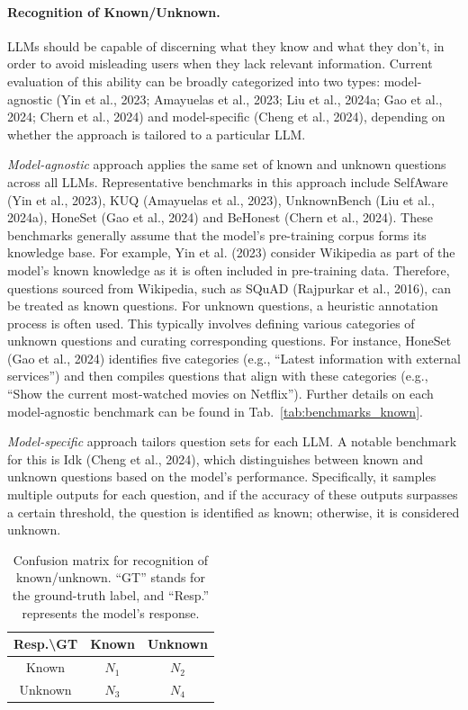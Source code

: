 \paragraph{Recognition of Known/Unknown.} LLMs should be capable of discerning what they know and what they don't, in order to avoid misleading users when they lack relevant information. Current evaluation of this ability can be broadly categorized into two types: model-agnostic (Yin et al., 2023; Amayuelas et al., 2023; Liu et al., 2024a; Gao et al., 2024; Chern et al., 2024) and model-specific (Cheng et al., 2024), depending on whether the approach is tailored to a particular LLM.

\emph{Model-agnostic} approach applies the same set of known and unknown questions across all LLMs. Representative benchmarks in this approach include SelfAware (Yin et al., 2023), KUQ (Amayuelas et al., 2023), UnknownBench (Liu et al., 2024a), HoneSet (Gao et al., 2024) and BeHonest (Chern et al., 2024). These benchmarks generally assume that the model's pre-training corpus forms its knowledge base. For example, Yin et al. (2023) consider Wikipedia as part of the model's known knowledge as it is often included in pre-training data. Therefore, questions sourced from Wikipedia, such as SQuAD (Rajpurkar et al., 2016), can be treated as known questions. For unknown questions, a heuristic annotation process is often used. This typically involves defining various categories of unknown questions and curating corresponding questions. For instance, HoneSet (Gao et al., 2024) identifies five categories (e.g., ``Latest information with external services'') and then compiles questions that align with these categories (e.g., ``Show the current most-watched movies on Netflix''). Further details on each model-agnostic benchmark can be found in Tab.~\ref{tab:benchmarks_known}.

\emph{Model-specific} approach tailors question sets for each LLM. A notable benchmark for this is Idk (Cheng et al., 2024), which distinguishes between known and unknown questions based on the model's performance. Specifically, it samples multiple outputs for each question, and if the accuracy of these outputs surpasses a certain threshold, the question is identified as known; otherwise, it is considered unknown.

\begin{table}[t]
\centering
\caption{Confusion matrix for recognition of known/unknown. ``GT'' stands for the ground-truth label, and ``Resp.'' represents the model's response.}
\label{tab:confusion}
\begin{tabular}{c|cc}
\toprule
Resp.\textbackslash GT & Known & Unknown \\
\midrule
Known & $N_1$ & $N_2$ \\
Unknown & $N_3$ & $N_4$ \\
\bottomrule
\end{tabular}
\end{table}

